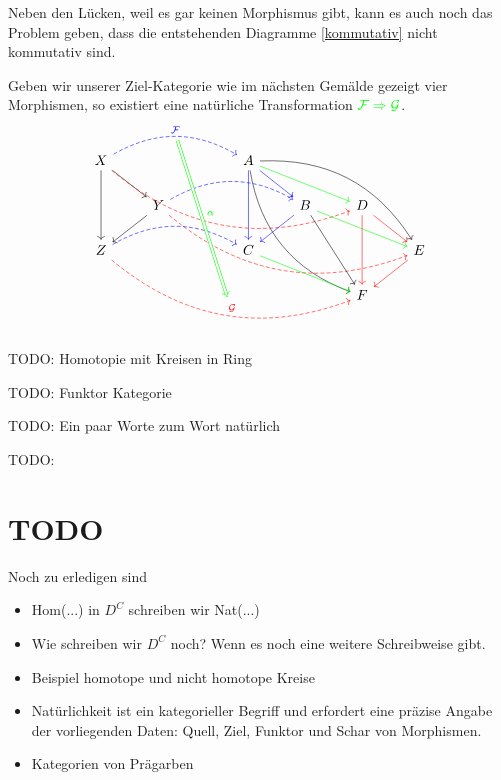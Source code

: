 \documentclass[a4paper]{amsart}
\theoremstyle{definition}
\begin{document}
Neben den Lücken, weil es gar keinen Morphismus gibt, kann es auch noch das Problem geben, dass die entstehenden Diagramme \eqref{kommutativ} nicht kommutativ sind.

Geben wir unserer Ziel-Kategorie wie im nächsten Gemälde gezeigt vier Morphismen, so existiert eine natürliche Transformation 
$\color{green} \mathcal F \Rightarrow \mathcal G$. 
\begin{equation}
	\begin{tikzcd}
		X \arrow[dd] \arrow[dr] \arrow[rrr, blue, dashed, bend left, "\mathcal F"{name=0}] \arrow[rrrrrd, red, dashed, bend right] &&& A \arrow[dd, blue] \arrow[dr, blue] \arrow[dddrr, bend right] \arrow[drr, green] \arrow[ddrrr, bend left]\\ 
		& Y \arrow[dl] \arrow[rrr, blue, dashed, bend left] \arrow[rrrrrd, red, dashed, bend right] &&&B \arrow[dl, blue] \arrow[ddr] \arrow[drr, green] &D \arrow[dd, red] \arrow[dr, red]\\
		Z \arrow[rrr, blue, dashed, bend left] \arrow[rrrrrd, red, dashed, bend right, "\mathcal G"{name=1}] &&&C  \arrow[drr, green] &&& E \arrow[dl, red]\\
		&&&&&F
		\arrow[Rightarrow, green, from=0, to=1,shorten >= 6pt, yshift = -3pt, "\alpha"{yshift=3pt}]
	\end{tikzcd}
\end{equation}

TODO: Homotopie mit Kreisen in Ring

TODO: Funktor Kategorie

TODO: Ein paar Worte zum Wort natürlich

TODO: 

\section{TODO}
Noch zu erledigen sind
\begin{itemize}
   \item Hom(...) in $D^C$ schreiben wir Nat(...)
   \item Wie schreiben wir $D^C$ noch? Wenn es noch eine weitere Schreibweise gibt.
   \item Beispiel homotope und nicht homotope Kreise
   \item Natürlichkeit ist ein kategorieller Begriff und erfordert eine präzise Angabe der vorliegenden Daten: Quell, Ziel, Funktor und Schar von Morphismen.
   \item Kategorien von Prägarben
\end{itemize}
\end{document}
